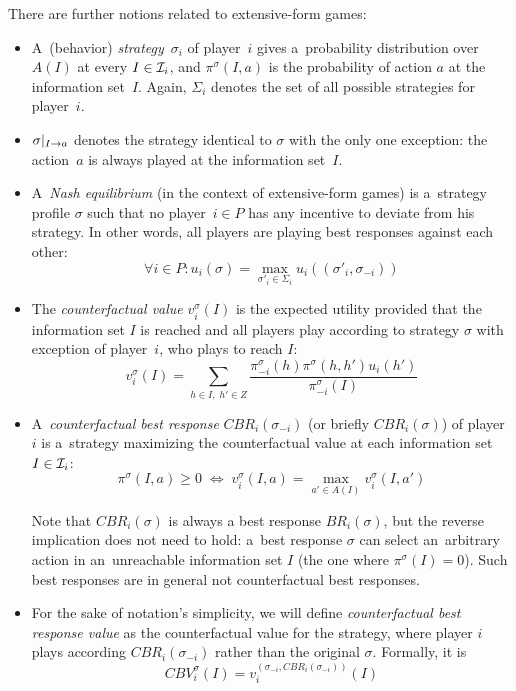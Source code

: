 \noindent
There are further notions related to extensive-form games:
\begin{itemize}
  \item A~(behavior) \emph{strategy}~$\sigma_i$ of player~$i$ gives a~probability distribution over $A(I)$ at every $I \in \mathcal{I}_i$, and $\pi ^\sigma (I, a)$ is the probability of action $a$ at the information set~$I$.
    Again, $\Sigma_i$ denotes the set of all possible strategies for player~$i$.

  \item $\sigma | _{I \rightarrow a}$ denotes the strategy identical to $\sigma$ with the only one exception:
    the action~$a$ is always played at the information set~$I$.

  \item A~\emph{Nash equilibrium} (in the context of extensive-form games) is a~strategy profile $\sigma$ such that no player~$i \in P$ has any incentive to deviate from his strategy.
    In other words, all players are playing best responses against each other:
    \[ \forall i \in P\colon u_i (\sigma) = \max _{\sigma'_i \in \Sigma_i} u_i ((\sigma'_i, \sigma_{-i})) \]

  \item The \emph{counterfactual value} $v _i ^\sigma (I)$ is the expected utility provided that the information set $I$ is reached and all players play according to strategy $\sigma$ with exception of player~$i$, who plays to reach $I$:
    \[ v _i ^\sigma (I) = \sum\limits _{h \in I, \; h' \in Z}
      \frac
      {\pi _{-i} ^\sigma(h) \pi ^\sigma(h,h') u_i(h')}
      {\pi _{-i} ^\sigma (I)} \]

  \item A~\emph{counterfactual best response} $CBR _i (\sigma _{-i})$ (or briefly $CBR _i (\sigma)$) of player~$i$ is a~strategy maximizing the counterfactual value at each information set $I \in \mathcal{I} _i$:
    \[ \pi ^\sigma (I, a) \geq 0
      \; \Longleftrightarrow \;
      v _i ^\sigma (I, a) = \max _{a' \in A(I)} v _i ^\sigma (I, a') \]

    Note that $CBR _i (\sigma)$ is always a best response $BR _i (\sigma)$, but the reverse implication does not need to hold:
    a~best response $\sigma$ can select an~arbitrary action in an~unreachable information set $I$ (the one where $\pi ^\sigma (I) = 0$).
    Such best responses are in general not counterfactual best responses.

  \item For the sake of notation's simplicity, we will define \emph{counterfactual best response value} as the counterfactual value for the strategy, where player $i$ plays according $CBR _i (\sigma _{-i})$ rather than the original $\sigma$.
    Formally, it is
    \[ CBV _i ^\sigma (I) = v _i ^{(\sigma _{-i}, CBR _i (\sigma _{-i} ))} (I) \]


\end{itemize}

